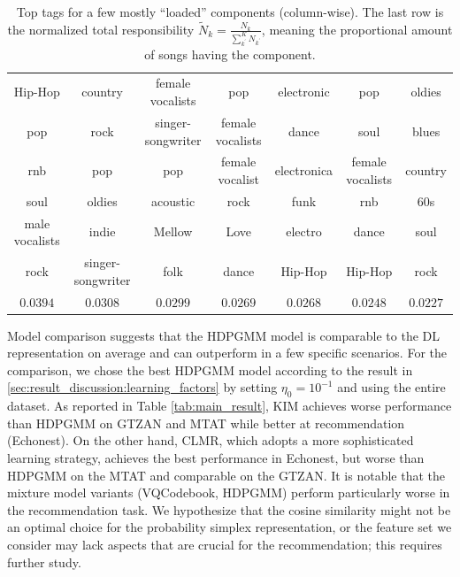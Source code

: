 \documentclass{article}
\begin{document}
\begin{table}[hbt!]
\centering
\small
\begin{tabular}{ccccccc}
    \hline
    Hip-Hop & country & female vocalists & pop & electronic & pop & oldies \\
    pop & rock & singer-songwriter & female vocalists & dance & soul & blues \\
    rnb & pop & pop & female vocalist & electronica & female vocalists & country \\
    soul & oldies & acoustic & rock & funk & rnb & 60s \\
    male vocalists & indie & Mellow & Love & electro & dance & soul \\
    rock & singer-songwriter & folk & dance & Hip-Hop & Hip-Hop & rock \\
    \hline
    $0.0394$ & $0.0308$ & $0.0299$ & $0.0269$ & $0.0268$ & $0.0248$ & $0.0227$ \\
    \hline
\end{tabular}
\caption{Top tags for a few mostly ``loaded'' components (column-wise). The last row is the normalized total responsibility $\tilde{N}_{k} = \frac{N_{k}}{\sum_{k^{\prime}}^{K} N_{k^{\prime}}}$, meaning the proportional amount of songs having the component.}
\vspace{-0.5cm}
\label{tab:topic_tags}
\end{table}


\vspace{-0.5cm}
Model comparison suggests that the HDPGMM model is comparable to the DL representation on average and can outperform in a few specific scenarios. For the comparison, we chose the best HDPGMM model according to the result in \ref{sec:result_discussion:learning_factors} by setting $\eta_{0}=10^{-1}$ and using the entire dataset. As reported in Table \ref{tab:main_result}, KIM achieves worse performance than HDPGMM on GTZAN and MTAT while better at recommendation (Echonest). On the other hand, CLMR, which adopts a more sophisticated learning strategy, achieves the best performance in Echonest, but worse than HDPGMM on the MTAT and comparable on the GTZAN. It is notable that the mixture model variants (VQCodebook, HDPGMM) perform particularly worse in the recommendation task. We hypothesize that the cosine similarity might not be an optimal choice for the probability simplex representation, or the feature set we consider may lack aspects that are crucial for the recommendation; this requires further study.
\end{document}
